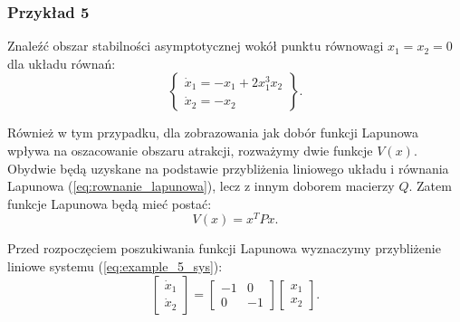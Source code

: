 \documentclass{article}
\begin{document}
        \subsubsection{Przykład 5}
        Znaleźć obszar stabilności asymptotycznej wokół punktu równowagi $x_{1}=x_{2}=0$ dla układu równań:
        \begin{equation}\label{eq:example_5_sys}
            \left\{
            \begin{array}{l}
                 \dot{x}_{1} = -x_{1} + 2x_{1}^{3}x_{2}\\
                 \dot{x}_{2} = -x_{2}
            \end{array}
            \right\}.
        \end{equation}

        Również w tym przypadku, dla zobrazowania jak dobór funkcji Lapunowa wpływa na oszacowanie obszaru atrakcji, rozważymy dwie funkcje $V(x)$.
        Obydwie będą uzyskane na podstawie przybliżenia liniowego układu i równania Lapunowa (\ref{eq:rownanie_lapunowa}), lecz z innym doborem macierzy $Q$.
        Zatem funkcje Lapunowa będą mieć postać:
        $$
            V(x) = x^{T}Px.
        $$

        Przed rozpoczęciem poszukiwania funkcji Lapunowa wyznaczymy przybliżenie liniowe systemu (\ref{eq:example_5_sys}):
        $$
            \begin{bmatrix} \dot{x}_{1} \\ \dot{x}_{2} \end{bmatrix}
            =
            \begin{bmatrix} -1 & 0 \\ 0 & -1 \end{bmatrix}
            \begin{bmatrix} x_{1} \\ x_{2} \end{bmatrix}.
        $$
\end{document}
